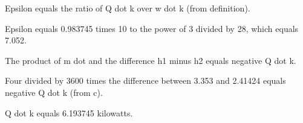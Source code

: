 Epsilon equals the ratio of Q dot k over w dot k (from definition).

Epsilon equals 0.983745 times 10 to the power of 3 divided by 28, which equals 7.052.

The product of m dot and the difference h1 minus h2 equals negative Q dot k.

Four divided by 3600 times the difference between 3.353 and 2.41424 equals negative Q dot k (from c).

Q dot k equals 6.193745 kilowatts.